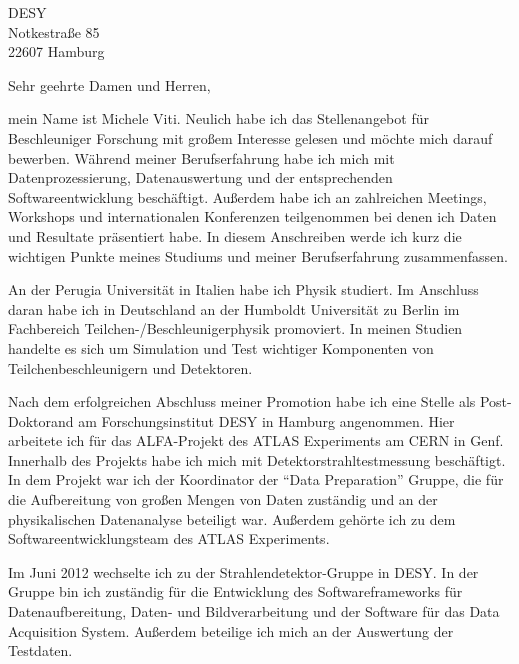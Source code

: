 \documentclass[ebner,paper=a4,fontsize=11pt,ngerman,BCOR=10mm]{scrlttr2}%
\begin{document}
\pagestyle{empty}

\begin{letter}{DESY\\
Notkestra{\ss}e 85\\ 
22607 Hamburg}


\opening{Sehr geehrte Damen und Herren,} 

mein Name ist Michele Viti. Neulich habe
ich das Stellenangebot f{\"u}r Beschleuniger Forschung mit gro{\ss}em Interesse
gelesen und m{\"o}chte mich darauf bewerben.  W\"ahrend meiner
Berufserfahrung habe ich mich mit Datenprozessierung, Datenauswertung
und der entsprechenden Softwareentwicklung besch{\"a}ftigt.
Au{\ss}erdem habe ich an zahlreichen Meetings, Workshops und
internationalen Konferenzen teilgenommen bei denen ich Daten und
Resultate pr\"asentiert habe. In diesem Anschreiben werde ich kurz die
wichtigen Punkte meines Studiums und meiner Berufserfahrung
zusammenfassen.



An der Perugia Universit\"at in Italien habe ich Physik studiert. Im
Anschluss daran habe ich in Deutschland an der Humboldt Universit\"at
zu Berlin im Fachbereich Teilchen-/Beschleunigerphysik promoviert. In
meinen Studien handelte es sich um Simulation und Test wichtiger
Komponenten von Teilchenbeschleunigern und Detektoren.

Nach dem erfolgreichen Abschluss meiner Promotion habe ich eine Stelle
als Post-Doktorand am Forschungsinstitut DESY in Hamburg
angenommen. Hier arbeitete ich f\"ur das ALFA-Projekt des ATLAS
Experiments am CERN in Genf. Innerhalb des Projekts habe ich mich mit
Detektorstrahltestmessung besch\"aftigt. In dem Projekt war ich der
Koordinator der "`Data Preparation"' Gruppe, die f\"ur die Aufbereitung
von gro{\ss}en Mengen von Daten zust\"andig und an der physikalischen
Datenanalyse beteiligt war. Au{\ss}erdem geh{\"o}rte ich zu dem
Softwareentwicklungsteam des ATLAS Experiments.

Im Juni 2012 wechselte ich zu der Strahlendetektor-Gruppe in DESY. In
der Gruppe bin ich zust\"andig f\"ur die Entwicklung des
Softwareframeworks f\"ur Datenaufbereitung, Daten- und
Bildverarbeitung und der Software f\"ur das Data Acquisition
System. Au{\ss}erdem beteilige ich mich an der Auswertung der
Testdaten.


\end{letter}
\end{document}
